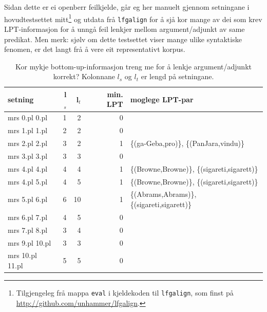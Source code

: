 \documentclass[12pt,a4paper,oneside,draft]{report}
\begin{document}
 Sidan dette er ei openberr feilkjelde, går eg her manuelt gjennom
 setningane i hovudtestsettet mitt\footnote{Tilgjengeleg frå mappa \texttt{eval} i kjeldekoden til \texttt{lfgalign},
        som finst på \href{http://github.com/unhammer/lfgalign}{http://github.com/unhammer/lfgalign}. } og utdata frå \texttt{lfgalign} for
 å sjå kor mange av dei som krev LPT\hyp{}informasjon for å unngå feil
 lenkjer mellom argument/adjunkt av same predikat. Men merk: sjølv om
 dette testsettet viser mange ulike syntaktiske fenomen, er det langt
 frå å vere eit representativt korpus.



\begin{table}[htb]
\caption{\label{tbl:LPT}Kor mykje bottom-up-informasjon treng me for å lenkje argument/adjunkt korrekt? Kolonnane $l_s$ og $l_t$ er lengd på setningane.}
\begin{center}
\begin{tabular}{lrrrl}
 setning            &  l$_s$  &  l$_t$  &  min. LPT  &  moglege LPT-par                               \\
\hline
 mrs 0.pl 0.pl      &      1  &      2  &         0  &                                                \\
 mrs 1.pl 1.pl      &      2  &      2  &         0  &                                                \\
 mrs 2.pl 2.pl      &      3  &      2  &         1  &  \{(ga-Geba,pro)\}, \{(PanJara,vindu)\}        \\
 mrs 3.pl 3.pl      &      3  &      3  &         0  &                                                \\
 mrs 4.pl 4.pl      &      4  &      4  &         1  &  \{(Browne,Browne)\}, \{(sigareti,sigarett)\}  \\
 mrs 4.pl 5.pl      &      4  &      5  &         1  &  \{(Browne,Browne)\}, \{(sigareti,sigarett)\}  \\
 mrs 5.pl 6.pl      &      6  &     10  &         1  &  \{(Abrams,Abrams)\}, \{(sigareti,sigarett)\}  \\
 mrs 6.pl 7.pl      &      4  &      5  &         0  &                                                \\
 mrs 7.pl 8.pl      &      3  &      4  &         0  &                                                \\
 mrs 9.pl 10.pl     &      3  &      3  &         0  &                                                \\
 mrs 10.pl 11.pl    &      5  &      5  &         0  &                                                \\

\end{tabular}
\end{center}
\end{table}
\end{document}
